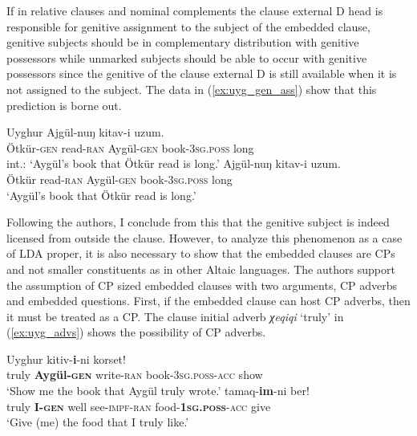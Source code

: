 \documentclass[output=paper
,modfonts
,nonflat]{langsci/langscibook}
\begin{document}
If in relative clauses and nominal complements the clause external D head is responsible for genitive assignment to the subject of the embedded clause, genitive subjects should be in complementary distribution with genitive possessors while unmarked subjects should be able to occur with genitive possessors since the genitive of the clause external D is still available when it is not assigned to the subject. The data in (\ref{ex:uyg_gen_ass}) show that this prediction is borne out.
\begin{exe}
\ex Uyghur \citep[][3]{Asarina_Hartman2011a} \label{ex:uyg_gen_ass}
	\xlist
	\ex 
		 Ajgül-nuŋ kitav-i uzum.\\
			 {} Ötkür-\textsc{gen} read-\textsc{ran} Aygül-\textsc{gen} book-3\textsc{sg.poss} long\\
		\glt int.: `Aygül's book that Ötkür read is long.'
	\ex
		 Ajgül-nuŋ kitav-i uzum.\\
			 {} Ötkür read-\textsc{ran} Aygül-\textsc{gen} book-3\textsc{sg.poss} long\\
		\glt `Aygül's book that Ötkür read is long.'
	\endxlist
\end{exe}
Following the authors, I conclude from this that the genitive subject is indeed licensed from outside the clause. However, to analyze this phenomenon as a case of LDA proper, it is also necessary to show that the embedded clauses are CPs and not smaller constituents as in other Altaic languages. The authors support the assumption of CP sized embedded clauses with two arguments, CP adverbs and embedded questions. First, if the embedded clause can host CP adverbs, then it must be treated as a CP. The clause initial adverb \textit{χeqiqi} `truly' in (\ref{ex:uyg_advs}) shows the possibility of CP adverbs.
\begin{exe}
\ex Uyghur \citep[][8]{Asarina_Hartman2011a}\label{ex:uyg_advs}
	\xlist
	\ex 
		  kitiv-\textbf{i}-ni korset!\\
			 {} truly \textbf{Aygül-\textsc{gen}} write-\textsc{ran} {} book-\textsc{3sg.poss}-\textsc{acc} show\\
		\glt `Show me the book that Aygül truly wrote.'
	\ex
		 tamaq-\textbf{im}-ni ber!\\
			 {} truly \textbf{I-\textsc{gen}} well see-\textsc{impf}-\textsc{ran} {} food-\textbf{\textsc{1sg.poss}}-\textsc{acc} give\\
		\glt `Give (me) the food that I truly like.'
	\endxlist
\end{exe}
\end{document}
